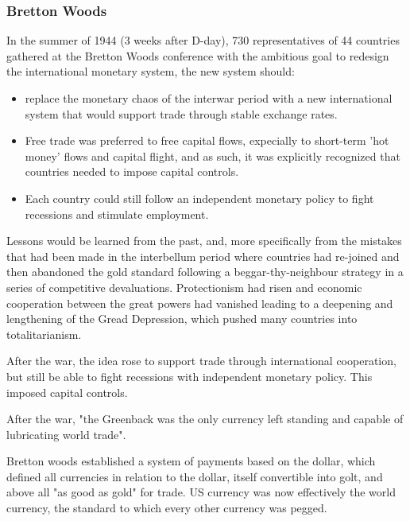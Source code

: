 \subsubsection{Bretton Woods}

In the summer of 1944 (3 weeks after D-day), 730 representatives of 44
countries gathered at the Bretton Woods conference with the ambitious goal
to redesign the international monetary system, the new system should:

\begin{itemize}
    \item replace the monetary chaos of the interwar period with a new
        international system that would support trade through stable exchange
        rates.
    \item Free trade was preferred to free capital flows, expecially to
        short-term 'hot money' flows and capital flight, and as such, it was
        explicitly recognized that countries needed to impose capital controls.
    \item Each country could still follow an independent monetary policy to
        fight recessions and stimulate employment.
\end{itemize}

Lessons would be learned from the past, and, more specifically from the
mistakes that had been made in the interbellum period where countries had
re-joined and then abandoned the gold standard following a beggar-thy-neighbour
strategy in a series of competitive devaluations. Protectionism had risen and
economic cooperation between the great powers had vanished leading to a
deepening and lengthening of the Gread Depression, which pushed many countries
into totalitarianism.

\vspace{1\baselineskip}

After the war, the idea rose to support trade through international cooperation,
but still be able to fight recessions with independent monetary policy. This
imposed capital controls.

\vspace{1\baselineskip}

After the war, "the Greenback was the only currency left standing and capable
of lubricating world trade".

\vspace{1\baselineskip}

Bretton woods established a system of payments based on the dollar, which
defined all currencies in relation to the dollar, itself convertible into
golt, and above all "as good as gold" for trade. US currency was now
effectively the world currency, the standard to which every other currency
was pegged.

